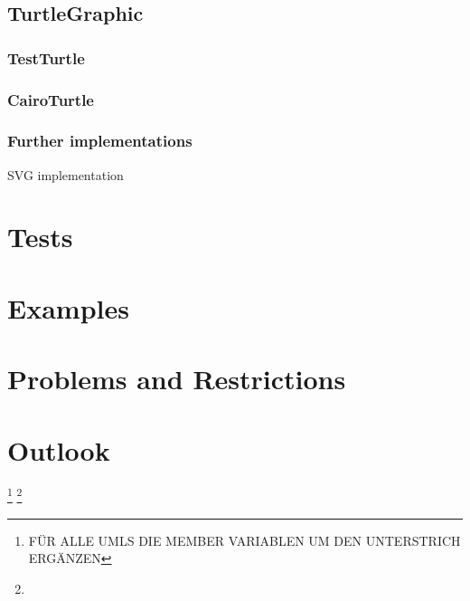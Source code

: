\documentclass[english]{cpp-hmwk}
\begin{document}
\subsection{TurtleGraphic}
\subsubsection{TestTurtle}
\subsubsection{CairoTurtle}
\subsubsection{Further implementations}
SVG implementation


\section{Tests}
\section{Examples}
\section{Problems and Restrictions}
\section{Outlook}

\footnote{FÜR ALLE UMLS DIE MEMBER VARIABLEN UM DEN UNTERSTRICH ERGÄNZEN}
\footnote{}
\end{document}
